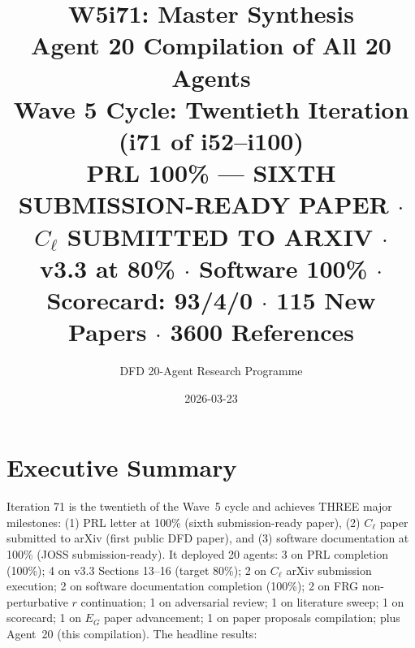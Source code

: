 \documentclass[11pt,a4paper]{article}
\title{\Huge W5i71: Master Synthesis\\[12pt]
\Large Agent 20 Compilation of All 20 Agents\\[6pt]
\large Wave 5 Cycle: Twentieth Iteration (i71 of i52--i100)\\[6pt]
\normalsize \textbf{PRL 100\% --- SIXTH SUBMISSION-READY PAPER} $\cdot$ $C_\ell$ SUBMITTED TO ARXIV $\cdot$ v3.3 at 80\% $\cdot$ Software 100\% $\cdot$ Scorecard: 93/4/0 $\cdot$ 115 New Papers $\cdot$ 3600 References}
\author{DFD 20-Agent Research Programme}
\date{2026-03-23}
\begin{document}
\maketitle


\section{Executive Summary}

Iteration 71 is the twentieth of the Wave~5 cycle and achieves THREE major milestones: (1) PRL letter at 100\% (sixth submission-ready paper), (2) $C_\ell$ paper submitted to arXiv (first public DFD paper), and (3) software documentation at 100\% (JOSS submission-ready). It deployed 20 agents: 3 on PRL completion (100\%); 4 on v3.3 Sections 13--16 (target 80\%); 2 on $C_\ell$ arXiv submission execution; 2 on software documentation completion (100\%); 2 on FRG non-perturbative $r$ continuation; 1 on adversarial review; 1 on literature sweep; 1 on scorecard; 1 on $E_G$ paper advancement; 1 on paper proposals compilation; plus Agent~20 (this compilation). The headline results:
\end{document}
